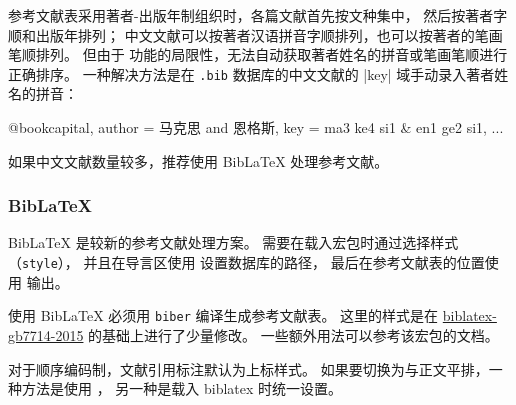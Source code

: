 \documentclass[a4paper]{ltxdoc}
\DeclareRobustCommand\file{\nolinkurl}
\DeclareRobustCommand\pkg{\textsf}
\DeclareRobustCommand\opt{\texttt}
\begin{document}
参考文献表采用著者-出版年制组织时，各篇文献首先按文种集中， 然后按著者字顺和出版年排列；
中文文献可以按著者汉语拼音字顺排列，也可以按著者的笔画笔顺排列。
但由于 \BibTeX{} 功能的局限性，无法自动获取著者姓名的拼音或笔画笔顺进行正确排序。
一种解决方法是在 \file{.bib} 数据库的中文文献的 |key| 域手动录入著者姓名的拼音：
\begin{latex}
  @book{capital,
    author = {马克思 and 恩格斯},
    key    = {ma3 ke4 si1 & en1 ge2 si1},
    ...
  }
\end{latex}
如果中文文献数量较多，推荐使用 BibLaTeX 处理参考文献。


\subsubsection{BibLaTeX}

BibLaTeX 是较新的参考文献处理方案。
需要在载入宏包时通过选择样式（\opt{style}），
并且在导言区使用  设置数据库的路径，
最后在参考文献表的位置使用  输出。
\begin{latex}
  \usepackage[style=ustcthesis-author-year]{biblatex}
  
\end{latex}
使用 BibLaTeX 必须用 \file{biber} 编译生成参考文献表。
这里的样式是在 \href{https://ctan.org/pkg/biblatex-gb7714-2015}{biblatex-gb7714-2015}
的基础上进行了少量修改。
一些额外用法可以参考该宏包的文档。

对于顺序编码制，文献引用标注默认为上标样式。
如果要切换为与正文平排，一种方法是使用 ，
另一种是载入 \pkg{biblatex} 时统一设置。
\begin{latex}
  \usepackage[bibstyle=ustcthesis-numeric,citestyle=ustcthesis-inline]{biblatex}
\end{latex}
\end{document}
